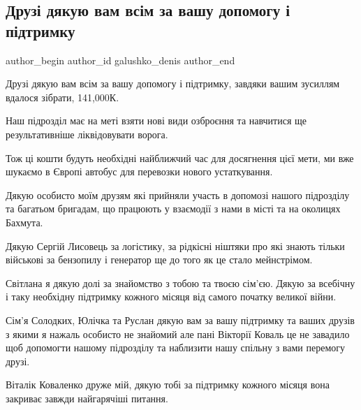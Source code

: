  
 
 
 
 

\subsection{Друзі дякую вам всім за вашу допомогу і підтримку}
\label{sec:22_12_2022.fb.galushko_denis.1.druz__dyakuyu_vam_vs}

\ifcmt
 author_begin
   author_id galushko_denis
 author_end
\fi

Друзі дякую вам всім за вашу допомогу і підтримку, завдяки вашим зусиллям
вдалося зібрати, 141,000К. 

Наш підрозділ має на меті взяти нові види озброєння та навчитися ще
результативніше ліквідовувати ворога. 

Тож ці кошти будуть необхідні найближчий час для досягнення цієї мети, ми вже
шукаємо в Європі автобус для перевозки нового устаткування.

Дякую особисто моїм друзям які прийняли участь в допомозі нашого підрозділу
та багатьом бригадам, що працюють у взаємодії з нами в місті та на околицях
Бахмута.

Дякую  Сергій Лисовець за логістику, за рідкісні ніштяки про які знають тільки
військові за бензопилу і генератор ще до того як це стало мейнстрімом.

Світлана я дякую долі за знайомство з тобою та твоєю сім’єю. Дякую за
всебічну і таку необхідну підтримку кожного місяця від самого початку
великої війни. 

Сім’я Солодких, Юлічка та Руслан дякую вам за вашу підтримку та ваших друзів
з якими я нажаль особисто не знайомий але пані Вікторії Коваль це не завадило
щоб допомогти нашому підрозділу та наблизити нашу спільну з вами перемогу
друзі.

Віталік Коваленко друже мій, дякую тобі за підтримку кожного місяця вона
закриває завжди найгарячіші питання.

